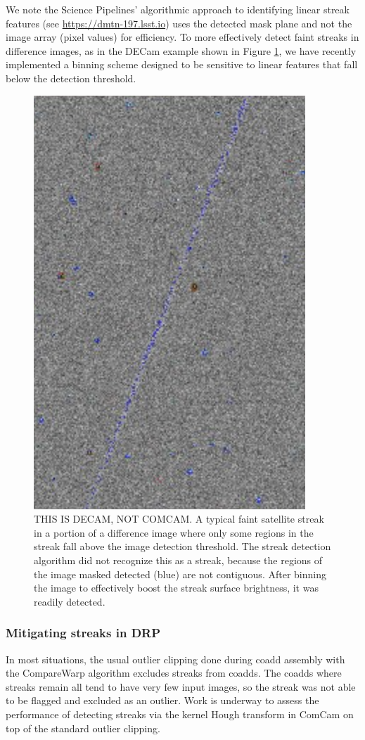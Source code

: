 We note the Science Pipelines' algorithmic approach to identifying linear streak features  (see \url{https://dmtn-197.lsst.io}) uses the detected mask plane and not the image array (pixel values) for efficiency. To more effectively detect faint streaks in difference images, as in the DECam example shown in Figure \ref{fig:decam-streak}, we have recently implemented a binning scheme designed to be sensitive to linear features that fall below the detection threshold.

\begin{figure}[ht!]
    \centering
    \includegraphics[width=0.5\linewidth]{figures/decam-streak.png}
    \caption{THIS IS DECAM, NOT COMCAM. A typical faint satellite streak in a portion of a difference image where only some regions in the streak fall above the image detection threshold. The streak detection algorithm did not recognize this as a streak, because the regions of the image masked detected (blue) are not contiguous. After binning the image to effectively boost the streak surface brightness, it was readily detected.}
    \label{fig:decam-streak}
\end{figure}

\subsubsection{Mitigating streaks in DRP}

In most situations, the usual outlier clipping done during coadd assembly with the CompareWarp algorithm excludes streaks from coadds. The coadds where streaks remain all tend to have very few input images, so the streak was not able to be flagged and excluded as an outlier. Work is underway to assess the performance of detecting streaks via the kernel Hough transform in ComCam on top of the standard outlier clipping.

